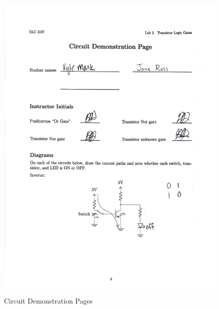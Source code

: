 \documentclass[11pt]{article}
\begin{document}
	\begin{figure}
		\centering
		\includegraphics[page=2,width=\textwidth]{"lab 2 results"}
		\caption{Circuit Demonstration Pages}
		\label{fig:lab-2-results2}
	\end{figure}
\end{document}
